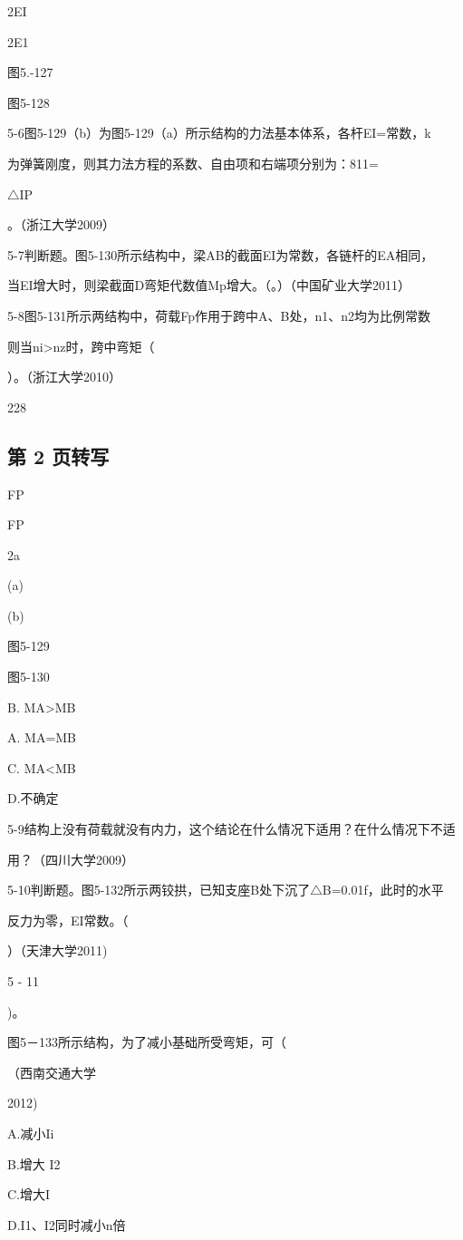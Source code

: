 2EI

2E1

图5.-127

图5-128

5-6图5-129（b）为图5-129（a）所示结构的力法基本体系，各杆EI=常数，k

为弹簧刚度，则其力法方程的系数、自由项和右端项分别为：811=

$\triangle$IP

。（浙江大学2009）

5-7判断题。图5-130所示结构中，梁AB的截面EI为常数，各链杆的EA相同，

当EI增大时，则梁截面D弯矩代数值Mp增大。（。）（中国矿业大学2011）

5-8图5-131所示两结构中，荷载Fp作用于跨中A、B处，n1、n2均为比例常数

则当ni>nz时，跨中弯矩（

）。（浙江大学2010）

228

\subsection*{第 2 页转写}
FP

FP

2a

(a)

(b)

图5-129

图5-130

B. MA>MB

A. MA=MB

C. MA<MB

D.不确定

5-9结构上没有荷载就没有内力，这个结论在什么情况下适用？在什么情况下不适

用？（四川大学2009）

5-10判断题。图5-132所示两铰拱，已知支座B处下沉了$\triangle$B=0.01f，此时的水平

反力为零，EI常数。（

）（天津大学2011)

5 - 11

)。

图5－133所示结构，为了减小基础所受弯矩，可（

（西南交通大学

2012)

A.减小Ii

B.增大 I2

C.增大I

D.I1、I2同时减小n倍

